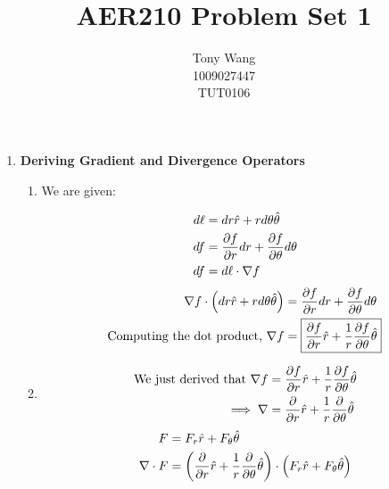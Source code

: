 \documentclass[12pt]{article}
\title{AER210 Problem Set 1}
\author{
Tony Wang \\
1009027447\\
TUT0106
}
\begin{document}
\maketitle
\vspace{-45pt}
\begin{enumerate}
    \item \textbf{Deriving Gradient and Divergence Operators}
    \vspace{-5pt}
    \begin{enumerate}
        \item We are given:
        \vspace{-15pt}
        \begin{center}
        \begin{align*}
            d\ell&=dr\hat{r}+rd\theta\hat{{\bf \theta}}\\
            df&=\frac{\partial f}{\partial r}dr+\frac{\partial f}{\partial \theta}d\theta\\
            df&=d\ell\cdot\nabla f
        \end{align*}
        \begin{align*}
            \nabla f \cdot \left(dr\hat{r}+rd\theta\hat{{\bf \theta}}\right) &= \frac{\partial f}{\partial r}dr+\frac{\partial f}{\partial \theta}d\theta\\
            \text{Computing the dot product, }\nabla f &= \boxed{\frac{\partial f}{\partial r} \hat{r} + \frac{1}{r}\frac{\partial f}{\partial \theta} \hat{{\bf \theta}}}
        \end{align*}
        \end{center}
        \item 
        \vspace{-5pt}
        \begin{align*}
            \text{We just derived that }\nabla f &= \frac{\partial f}{\partial r} \hat{r} + \frac{1}{r}\frac{\partial f}{\partial \theta} \hat{{\bf \theta}}\\
            \implies \nabla &= \frac{\partial}{\partial r}\hat{r}+\frac{1}{r}\frac{\partial}{\partial \theta}\hat{{\bf \theta}}
        \end{align*}
        \begin{align*}
            F&=F_r\hat{r}+F_\theta\hat{{\bf \theta}}\\
            \nabla \cdot F &= \left(\frac{\partial}{\partial r}\hat{r}+\frac{1}{r}\frac{\partial}{\partial \theta}\hat{{\bf \theta}}\right)\cdot\left(F_r\hat{r}+F_\theta\hat{{\bf \theta}}\right)\\

\end{align*}
\end{enumerate}
\end{enumerate}
\end{document}
